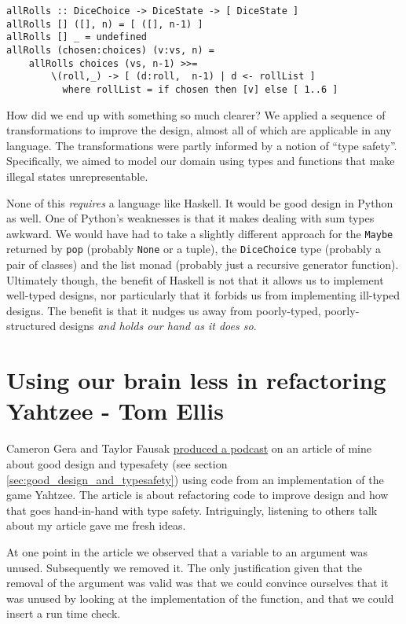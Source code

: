 \begin{verbatim}
allRolls :: DiceChoice -> DiceState -> [ DiceState ]
allRolls [] ([], n) = [ ([], n-1) ]
allRolls [] _ = undefined
allRolls (chosen:choices) (v:vs, n) =
    allRolls choices (vs, n-1) >>=
        \(roll,_) -> [ (d:roll,  n-1) | d <- rollList ]
          where rollList = if chosen then [v] else [ 1..6 ]
\end{verbatim}
How did we end up with something so much clearer? We applied a sequence of transformations to improve the design, almost all of which are applicable in any language. The transformations were partly informed by a notion of ``type safety''. Specifically, we aimed to model our domain using types and functions that make illegal states unrepresentable.

None of this \textit{requires} a language like Haskell. It would be good design in Python as well. One of Python's weaknesses is that it makes dealing with sum types awkward. We would have had to take a slightly different approach for the \texttt{Maybe} returned by \texttt{pop} (probably \texttt{None} or a tuple), the \texttt{DiceChoice} type (probably a pair of classes) and the list monad (probably just a recursive generator function). Ultimately though, the benefit of Haskell is not that it allows us to implement well-typed designs, nor particularly that it forbids us from implementing ill-typed designs. The benefit is that it nudges us away from poorly-typed, poorly-structured designs \textit{and holds our hand as it does so}.








\chapter{Using our brain less in refactoring Yahtzee - Tom Ellis}

Cameron Gera and Taylor Fausak \href{https://haskellweekly.news/episode/22.html}{produced a podcast} on an article of mine about good design and typesafety (see section \ref{sec:good_design_and_typesafety}) using code from an implementation of the game Yahtzee. The article is about refactoring code to improve design and how that goes hand-in-hand with type safety. Intriguingly, listening to others talk about my article gave me fresh ideas.

At one point in the article we observed that a variable to an argument was unused. Subsequently we removed it. The only justification given that the removal of the argument was valid was that we could convince ourselves that it was unused by looking at the implementation of the function, and that we could insert a run time check.

